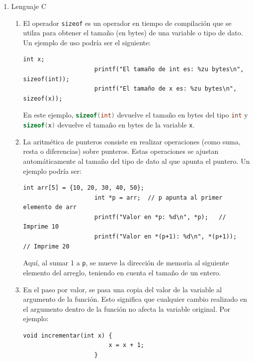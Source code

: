 \documentclass[12pt]{article}
\begin{document}
        \begin{enumerate}
            \item Lenguaje C
            \begin{enumerate}[label*=\arabic*.]
                \item El operador \texttt{sizeof} es un operador en tiempo de compilación que se utilza para obtener el tamaño (en bytes) de una variable o tipo de dato. Un ejemplo de uso podría ser el siguiente:
                \begin{lstlisting}[xleftmargin=-12.1em, inputencoding=utf8]
                    int x;
                    printf("El tamaño de int es: %zu bytes\n", sizeof(int));
                    printf("El tamaño de x es: %zu bytes\n", sizeof(x));
                \end{lstlisting}
                En este ejemplo, \lstinline[language=C]|sizeof(int)| devuelve el tamaño en bytes del tipo \lstinline[language=C]|int| y \lstinline[language=C]|sizeof(x)| devuelve el tamaño en bytes de la variable \lstinline[language=C]|x|.

                \item La aritmética de punteros consiste en realizar operaciones (como suma, resta o diferencias) sobre punteros. Estas operaciones se ajustan automáticamente al tamaño del tipo de dato al que apunta el puntero. Un ejemplo podría ser:
                \begin{lstlisting}[xleftmargin=-12.1em, inputencoding=utf8]
                    int arr[5] = {10, 20, 30, 40, 50};
                    int *p = arr;  // p apunta al primer elemento de arr
                    printf("Valor en *p: %d\n", *p);   // Imprime 10
                    printf("Valor en *(p+1): %d\n", *(p+1));  // Imprime 20                    
                \end{lstlisting}
                Aquí, al sumar 1 a \lstinline[language=C]|p|, se mueve la dirección de memoria al siguiente elemento del arreglo, teniendo en cuenta el tamaño de un entero.

                \item En el paso por valor, se pasa una copia del valor de la variable al argumento de la función. Esto significa que cualquier cambio realizado en el argumento dentro de la función no afecta la variable original. Por ejemplo:
                \begin{lstlisting}[xleftmargin=-12.1em, inputencoding=utf8]
                    void incrementar(int x) {
                        x = x + 1;
                    }


\end{lstlisting}
\end{enumerate}
\end{enumerate}
\end{document}
